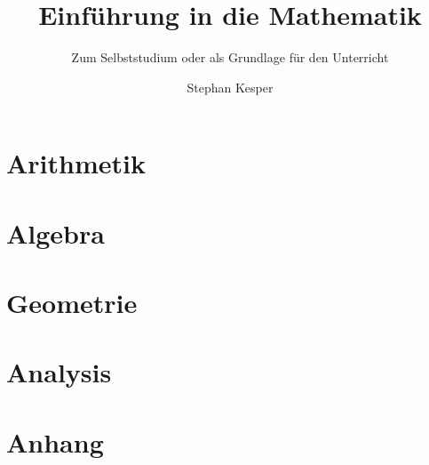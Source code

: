 \documentclass[graybox,envcountchap,sectrefs,deutsch]{svmono}
\author{Stephan Kesper}
\title{Einführung in die Mathematik}
\subtitle{Zum Selbststudium oder als Grundlage für den Unterricht}
\begin{document}
\maketitle

\frontmatter



\tableofcontents

\mainmatter

\part{Arithmetik}



\part{Algebra}



\part{Geometrie}



\part{Analysis}

\appendix
\part{Anhang}



\backmatter
\end{document}

